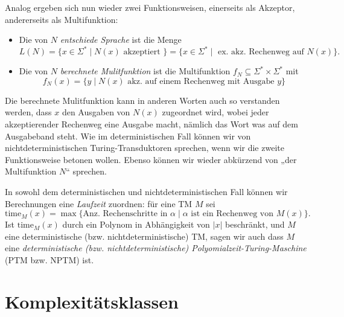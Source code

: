 Analog ergeben sich nun wieder zwei Funktionsweisen, einerseits als Akzeptor, andererseits als Multifunktion:
\begin{itemize}
    \item Die von $N$ \emph{entschiede  Sprache} ist die Menge \[ L(N)=\{ x\in\Sigma^* \mid N(x) \text{ akzeptiert } \} = \{ x\in\Sigma^* \mid \text{ ex. akz. Rechenweg auf $N(x)$} \}. \]
    \item Die von $N$ \emph{berechnete Mulitfunktion} ist die Multifunktion $f_N\subseteq\Sigma^*\times\Sigma^*$ mit
        \[ f_N(x) = \{ y \mid \text{$N(x)$ akz. auf einem Rechenweg mit Ausgabe $y$} \}  \] 
\end{itemize}
Die berechnete Mulitfunktion kann in anderen Worten auch so verstanden werden, dass $x$ den Ausgaben von $N(x)$ zugeordnet wird, wobei jeder akzeptierender Rechenweg eine Ausgabe macht, nämlich das Wort was auf dem Ausgabeband steht.
Wie im deterministischen Fall können wir von nichtdeterministischen Turing-Transduktoren sprechen, wenn wir die zweite Funktionsweise betonen wollen. Ebenso können wir wieder abkürzend von „der Multifunktion $N$“ sprechen.

In sowohl dem deterministischen und nichtdeterministischen Fall können wir Berechnungen eine \emph{Laufzeit} zuordnen: für eine TM $M$ sei
\[ \mathrm{time}_M(x) = \max \{ \text{Anz. Rechenschritte in $\alpha$} \mid \text{$\alpha$ ist ein Rechenweg von $M(x)$}  \}. \]
Ist $\mathrm{time}_M(x)$ durch ein Polynom in Abhängigkeit von $|x|$ beschränkt, und $M$ eine deterministische (bzw. nichtdeterministische) TM, sagen wir auch dass $M$ eine \emph{deterministische (bzw. nichtdeterministische) Polyomialzeit-Turing-Maschine} (PTM bzw. NPTM) ist. 


\section{Komplexitätsklassen}\label{sec:prelim-klassen}

